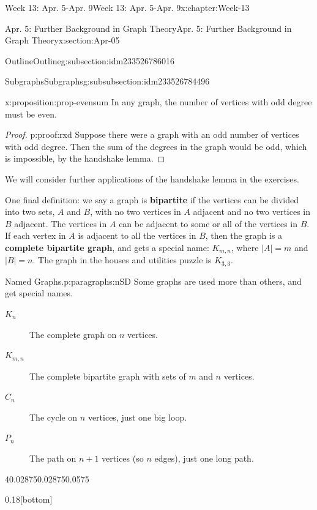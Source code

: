 \documentclass[oneside,10pt,]{book}
\newcommand{\terminology}[1]{\textbf{#1}}
\numberwithin{equation}{section}
\begin{document}
\begin{chapterptx}{Week 13: Apr. 5-Apr. 9}{}{Week 13: Apr. 5-Apr. 9}{}{}{x:chapter:Week-13}
\begin{sectionptx}{Apr. 5: Further Background in Graph Theory}{}{Apr. 5: Further Background in Graph Theory}{}{}{x:section:Apr-05}
\begin{subsectionptx}{Outline}{}{Outline}{}{}{g:subsection:idm233526786016}
\begin{subsubsectionptx}{Subgraphs}{}{Subgraphs}{}{}{g:subsubsection:idm233526784496}
\begin{proposition}{}{}{x:proposition:prop-evensum}%
In any graph, the number of vertices with odd degree must be even.%
\end{proposition}
\begin{proof}{}{p:proof:rxd}
Suppose there were a graph with an odd number of vertices with odd degree.  Then the sum of the degrees in the graph would be odd, which is impossible, by the handshake lemma.%
\end{proof}
We will consider further applications of the handshake lemma in the exercises.%
\par
{} One final definition: we say a graph is \terminology{bipartite} if the vertices can be divided into two sets, \(A\) and \(B\), with no two vertices in \(A\) adjacent and no two vertices in \(B\) adjacent. The vertices in \(A\) can be adjacent to some or all of the vertices in \(B\). If each vertex in \(A\) is adjacent to all the vertices in \(B\), then the graph is a \terminology{complete bipartite graph}, and gets a special name: \(K_{m,n}\), where \(|A| = m\) and \(|B| = n\). The graph in the houses and utilities puzzle is \(K_{3,3}\).%
\begin{paragraphs}{Named Graphs.}{p:paragraphs:nSD}%
%
%
%
%
%
%
%
%
Some graphs are used more than others, and get special names.%
\begin{description}
\item[{\(K_n\)}]The complete graph on \(n\) vertices. \label{g:notation:idm233526710000}%
\item[{\(K_{m,n}\)}]The complete bipartite graph with sets of \(m\) and \(n\) vertices. \label{g:notation:idm233526706160}%
\item[{\(C_n\)}]The cycle on \(n\) vertices, just one big loop. \label{g:notation:idm233526702208}%
\item[{\(P_n\)}]The path on \(n+1\) vertices (so \(n\) edges), just one long path. \label{g:notation:idm233526698032}%
\end{description}
%
\begin{sidebyside}{4}{0.02875}{0.02875}{0.0575}%
\begin{sbspanel}{0.18}[bottom]%
\resizebox{\linewidth}{!}{%
				\begin{tikzpicture}[scale=1]

\end{tikzpicture}}
\end{sbspanel}
\end{sidebyside}
\end{paragraphs}
\end{subsubsectionptx}
\end{subsectionptx}
\end{sectionptx}
\end{chapterptx}
\end{document}

